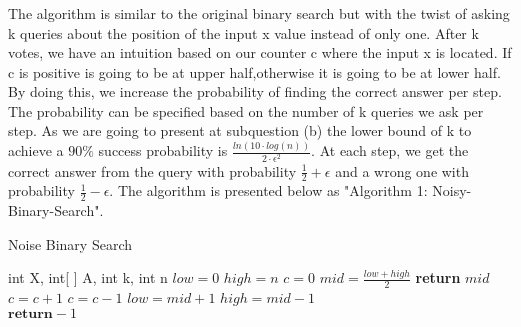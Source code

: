 \documentclass[11pt]{537homework}
\begin{document}
\subsubsection{}
The algorithm is similar to the original binary search but with the twist of asking k queries about the position of the input x value instead of only one. After k votes, we have an intuition based on our counter c where the input x is located. If c is positive is going to be at upper half,otherwise it is going to be at lower half. By doing this, we increase the probability of finding the correct answer per step. The probability can be specified based on the number of k queries we ask per step. As we are going to present at subquestion (b) the lower bound of k to achieve a $90\%$ success probability is $\frac{ln(10 \cdot log(n))}{2 \cdot \epsilon^2} $. At each step, we get the correct answer from the query with probability $\frac{1}{2} + \epsilon$ and a wrong one with probability $\frac{1}{2} - \epsilon$. The algorithm is presented below as "Algorithm 1: Noisy-Binary-Search".

\begin{algorithm}
\caption{Noise Binary Search}
\begin{algorithmic}
    \Require int X, int[ ] A, int k, int n
    \State $low = 0$
    \State $high = n$
      \State $c = 0$
      \State $mid = \frac{low + high}{2}$
         \textbf{return} $mid$
         $c = c+1$
         $c =c-1$
      \EndFor
{} 
  \State $low = mid + 1$
\Else
  \State $high = mid - 1$
\EndIf 
\EndWhile \\
$\textbf{return} -1 $
\end{algorithmic}
\end{algorithm}
\end{document}
